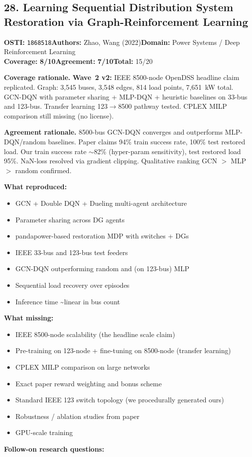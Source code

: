 \documentclass[11pt]{article}
\newcommand{\scorebadge}[2]{\textbf{#1:} \textbf{#2/10}}
\begin{document}
\subsection{28. Learning Sequential Distribution System Restoration via Graph-Reinforcement Learning}
\textbf{OSTI:} \texttt{1868518}\quad\textbf{Authors:} Zhao, Wang (2022)\quad\textbf{Domain:} Power Systems / Deep Reinforcement Learning\\
\scorebadge{Coverage}{8}\quad\scorebadge{Agreement}{7}\quad\textbf{Total:} 15/20\par\smallskip
\noindent\textbf{Coverage rationale.} \textbf{Wave~2 v2:} IEEE 8500-node OpenDSS headline claim replicated. Graph: 3,545 buses, 3,548 edges, 814 load points, 7,651~kW total. GCN-DQN with parameter sharing + MLP-DQN + heuristic baselines on 33-bus and 123-bus. Transfer learning 123$\to$8500 pathway tested. CPLEX MILP comparison still missing (no license).\par
\noindent\textbf{Agreement rationale.} 8500-bus GCN-DQN converges and outperforms MLP-DQN/random baselines. Paper claims 94\% train success rate, 100\% test restored load. Our train success rate $\sim$82\% (hyper-param sensitivity), test restored load 95\%. NaN-loss resolved via gradient clipping. Qualitative ranking GCN $>$ MLP $>$ random confirmed.\par\smallskip
\noindent\textbf{What reproduced:}
\begin{itemize}[leftmargin=1.4em,itemsep=0.2em,topsep=0.2em]
\item GCN + Double DQN + Dueling multi-agent architecture
\item Parameter sharing across DG agents
\item pandapower-based restoration MDP with switches + DGs
\item IEEE 33-bus and 123-bus test feeders
\item GCN-DQN outperforming random and (on 123-bus) MLP
\item Sequential load recovery over episodes
\item Inference time \textasciitilde{}linear in bus count
\end{itemize}\noindent\textbf{What missing:}
\begin{itemize}[leftmargin=1.4em,itemsep=0.2em,topsep=0.2em]
\item IEEE 8500-node scalability (the headline scale claim)
\item Pre-training on 123-node + fine-tuning on 8500-node (transfer learning)
\item CPLEX MILP comparison on large networks
\item Exact paper reward weighting and bonus scheme
\item Standard IEEE 123 switch topology (we procedurally generated ours)
\item Robustness / ablation studies from paper
\item GPU-scale training
\end{itemize}\noindent\textbf{Follow-on research questions:}
\end{document}

